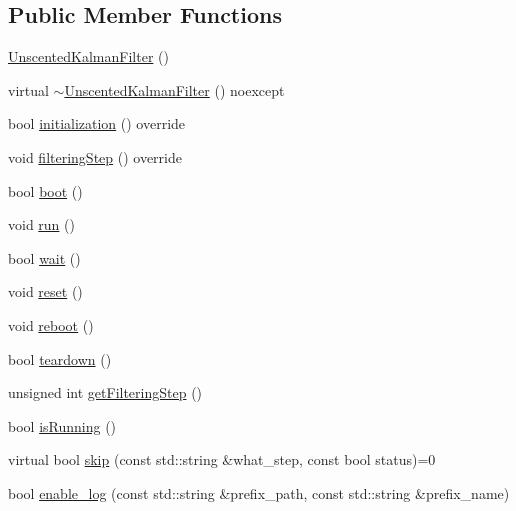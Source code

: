 \subsection*{Public Member Functions}
\begin{DoxyCompactItemize}
\item 
\mbox{\hyperlink{classbfl_1_1UnscentedKalmanFilter_a18a80ca47ed5440b116e1abd8be406b6}{Unscented\+Kalman\+Filter}} ()
\item 
virtual \mbox{\hyperlink{classbfl_1_1UnscentedKalmanFilter_ac3b1c8406622c7295da808fe95e4c170}{$\sim$\+Unscented\+Kalman\+Filter}} () noexcept
\item 
bool \mbox{\hyperlink{classbfl_1_1UnscentedKalmanFilter_ad221e4abd58c2e67e9b44f52a0c9504f}{initialization}} () override
\item 
void \mbox{\hyperlink{classbfl_1_1UnscentedKalmanFilter_a169451bb711a03ad2dc28a40e3ad867f}{filtering\+Step}} () override
\item 
bool \mbox{\hyperlink{classbfl_1_1FilteringAlgorithm_a96651f8464190c0a56d79219a1017147}{boot}} ()
\item 
void \mbox{\hyperlink{classbfl_1_1FilteringAlgorithm_a009cbe5f4bbb16967f6c6ddcaed8fbb1}{run}} ()
\item 
bool \mbox{\hyperlink{classbfl_1_1FilteringAlgorithm_a40372c24fa050eb0274371172df0a244}{wait}} ()
\item 
void \mbox{\hyperlink{classbfl_1_1FilteringAlgorithm_a2403c62fbd7bd7f5cda56a84f5f30331}{reset}} ()
\item 
void \mbox{\hyperlink{classbfl_1_1FilteringAlgorithm_a6022859aa985474fb997343cc935b11e}{reboot}} ()
\item 
bool \mbox{\hyperlink{classbfl_1_1FilteringAlgorithm_a1dc912d89ee8f96d4f3e8209865c5308}{teardown}} ()
\item 
unsigned int \mbox{\hyperlink{classbfl_1_1FilteringAlgorithm_a8c43b1f3dac30934c0a03de348d4a29d}{get\+Filtering\+Step}} ()
\item 
bool \mbox{\hyperlink{classbfl_1_1FilteringAlgorithm_a5cfecab2c778620e2557237472bb1721}{is\+Running}} ()
\item 
virtual bool \mbox{\hyperlink{classbfl_1_1FilteringAlgorithm_ac8a718a614905d89d6a43bbbc70d68b2}{skip}} (const std\+::string \&what\+\_\+step, const bool status)=0
\item 
bool \mbox{\hyperlink{classbfl_1_1Logger_ae94b97b6e8d7902e8ce048384813122e}{enable\+\_\+log}} (const std\+::string \&prefix\+\_\+path, const std\+::string \&prefix\+\_\+name)
\item 

\end{DoxyCompactItemize}
